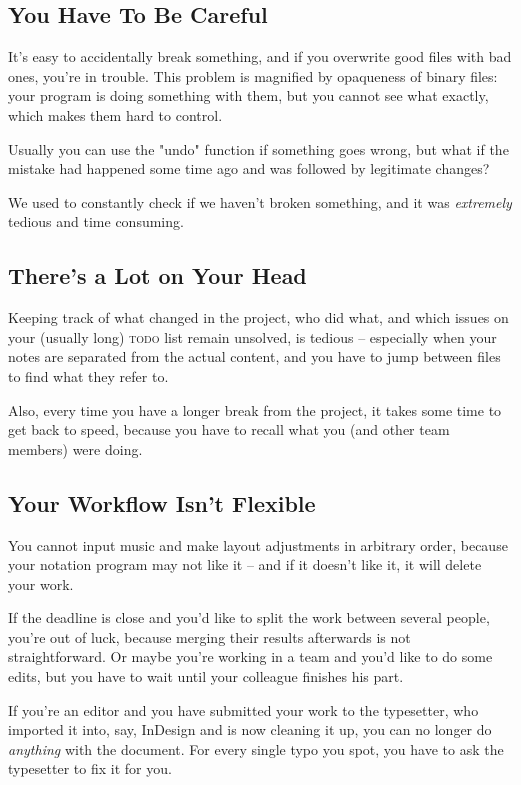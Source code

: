 \documentclass[11pt,a4paper]{article}
\begin{document}
\subsection{You Have To Be Careful}
It's easy to accidentally break something, and if you overwrite good files
with bad ones, you're in trouble.  This problem is magnified by opaqueness
of binary files: your program is doing something with them,
but you cannot see what exactly, which makes them hard to control.

Usually you can use the "undo" function if something goes wrong,
but what if the mistake had happened some time ago and was followed by legitimate changes?

We used to constantly check if we haven't broken something,
and it was \emph{extremely} tedious and time consuming.

\subsection{There's a Lot on Your Head}
Keeping track of what changed in the project, who did what,
and which issues on your (usually long) \textsc{todo} list remain
unsolved, is tedious -- especially when your notes are separated from
the actual content, and you have to jump between files to find
what they refer to.

Also, every time you have a longer break from the project, it takes some
time to get back to speed, because you have to recall what you
(and other team members) were doing.

\subsection{Your Workflow Isn't Flexible}
You cannot input music and make layout adjustments in arbitrary order, because
your notation program may not like it -- and if it doesn't like it,
it will delete your work.

If the deadline is close and you'd like to split the work between several people,
you're out of luck, because merging their results afterwards is not straightforward.
Or maybe you're working in a team and you'd like to do some edits, but you have to wait
until your colleague finishes his part.

If you're an editor and you have submitted your work to the typesetter, who imported it
into, say, InDesign and is now cleaning it up, you can no longer do \emph{anything} with
the document.  For every single typo you spot, you have to ask the typesetter to fix it
for you.
\end{document}
